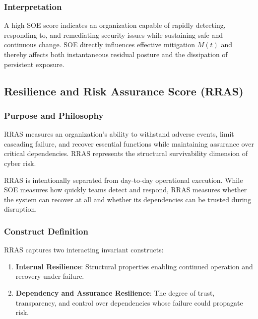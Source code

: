 \documentclass[11pt]{article}
\begin{document}
\subsubsection{Interpretation}
A high SOE score indicates an organization capable of rapidly detecting, responding
to, and remediating security issues while sustaining safe and continuous change.
SOE directly influences effective mitigation $M(t)$ and thereby affects both instantaneous residual posture and the dissipation of persistent exposure.

\subsection{Resilience and Risk Assurance Score (RRAS)}
\subsubsection{Purpose and Philosophy}
RRAS measures an organization’s ability to withstand adverse events, limit cascading
failure, and recover essential functions while maintaining assurance over critical
dependencies. RRAS represents the structural survivability dimension of cyber risk.

RRAS is intentionally separated from day-to-day operational execution. While SOE
measures how quickly teams detect and respond, RRAS measures whether the system can
recover at all and whether its dependencies can be trusted during disruption.

\subsubsection{Construct Definition}
RRAS captures two interacting invariant constructs:
\begin{enumerate}
  \item \textbf{Internal Resilience}: Structural properties enabling continued operation
    and recovery under failure.
  \item \textbf{Dependency and Assurance Resilience}: The degree of trust, transparency,
    and control over dependencies whose failure could propagate risk.
\end{enumerate}
\end{document}
